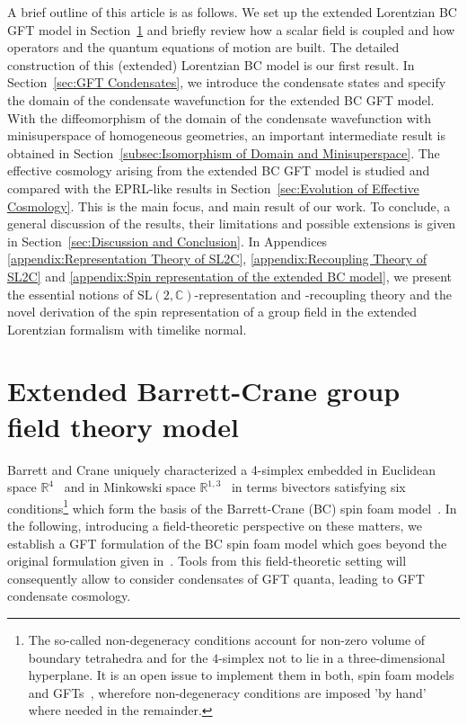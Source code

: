 \documentclass[11pt,a4paper]{article}
\newcommand{\R}{\mathbb R}
\newcommand{\C}{\mathbb C}
\newcommand{\SL}{\text{SL$(2,\C)$}}
\begin{document}
A brief outline of this article is as follows. 
We set up the extended Lorentzian BC GFT model in Section~\ref{sec:Extended Barrett-Crane Group Field Theory Model} and briefly review how a scalar field is coupled and how operators and the quantum equations of motion are built. The detailed construction of this (extended) Lorentzian BC model is our first result.
In Section~\ref{sec:GFT Condensates}, we introduce the condensate states and specify the domain of the condensate wavefunction for the extended BC GFT model. 
With the diffeomorphism of the domain of the condensate wavefunction with minisuperspace of homogeneous geometries, an important intermediate result is obtained in Section~\ref{subsec:Isomorphism of Domain and Minisuperspace}. 
The effective cosmology arising from the extended BC GFT model is studied and compared with the EPRL-like results in Section~\ref{sec:Evolution of Effective Cosmology}. This is the main focus, and main result of our work.
To conclude, a general discussion of the results, their limitations and possible extensions is given in Section~\ref{sec:Discussion and Conclusion}. 
In Appendices \ref{appendix:Representation Theory of SL2C}, \ref{appendix:Recoupling Theory of SL2C} and \ref{appendix:Spin representation of the extended BC model}, we present the essential notions of $\SL$-representation and -recoupling theory and the novel derivation of the spin representation of a group field in the extended Lorentzian formalism with timelike normal. 

\section{Extended Barrett-Crane group field theory model}\label{sec:Extended Barrett-Crane Group Field Theory Model}

Barrett and Crane uniquely characterized a 4-simplex embedded in Euclidean space $\R^4$~\cite{Barrett:1997gw} and in Minkowski space $\R^{1,3}$~\cite{Barrett:1999qw} in terms bivectors satisfying six conditions\footnote{The so-called non-degeneracy conditions account for non-zero volume of boundary tetrahedra and for the $4$-simplex not to lie in a three-dimensional hyperplane. It is an open issue to implement them in both, spin foam models and GFTs~\cite{Dittrich:2010ey,Baratin:2011tx}, wherefore non-degeneracy conditions are imposed 'by hand' where needed in the remainder.} which form the basis of the Barrett-Crane (BC) spin foam model~\cite{Barrett:1999qw}. In the following, introducing a field-theoretic perspective on these matters, we establish a GFT formulation of the BC spin foam model which goes beyond the original formulation given in~\cite{Perez:2000ec}. Tools from this field-theoretic setting will consequently allow to consider condensates of GFT quanta, leading to GFT condensate cosmology. 
\end{document}

